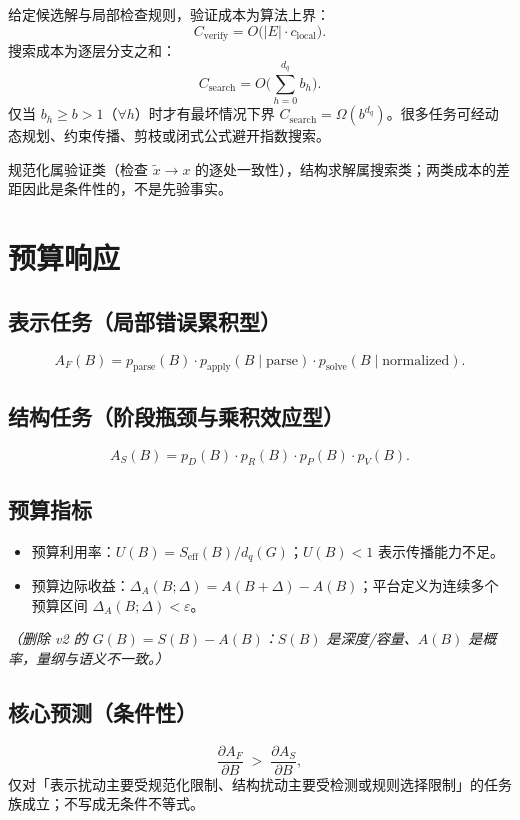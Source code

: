 \documentclass[11pt]{ctexart}
\begin{document}
给定候选解与局部检查规则，验证成本为算法上界：
\[
  C_{\mathrm{verify}} = O\big(|E|\cdot c_{\mathrm{local}}\big).
\]
搜索成本为逐层分支之和：
\[
  C_{\mathrm{search}} = O\Big(\textstyle\sum_{h=0}^{d_q} b_h\Big).
\]
仅当 $b_h\ge b>1$（$\forall h$）时才有最坏情况下界 $C_{\mathrm{search}}=\Omega(b^{d_q})$。很多任务可经动态规划、约束传播、剪枝或闭式公式避开指数搜索。

规范化属验证类（检查 $\tilde{x}\to x$ 的逐处一致性），结构求解属搜索类；两类成本的差距因此是条件性的，不是先验事实。

\section{预算响应}

\subsection{表示任务（局部错误累积型）}
\[
  A_F(B) = p_{\mathrm{parse}}(B)\cdot p_{\mathrm{apply}}(B\mid \mathrm{parse})\cdot p_{\mathrm{solve}}(B\mid \mathrm{normalized}).
\]

\subsection{结构任务（阶段瓶颈与乘积效应型）}
\[
  A_S(B) = p_D(B)\cdot p_R(B)\cdot p_P(B)\cdot p_V(B).
\]

\subsection{预算指标}
\begin{itemize}
  \item 预算利用率：$U(B) = S_{\mathrm{eff}}(B) / d_q(G)$；$U(B)<1$ 表示传播能力不足。
  \item 预算边际收益：$\Delta_A(B;\Delta) = A(B+\Delta) - A(B)$；平台定义为连续多个预算区间 $\Delta_A(B;\Delta)<\varepsilon$。
\end{itemize}
\textit{（删除 v2 的 $G(B)=S(B)-A(B)$：$S(B)$ 是深度/容量、$A(B)$ 是概率，量纲与语义不一致。）}

\subsection{核心预测（条件性）}
\[
  \frac{\partial A_F}{\partial B} \;>\; \frac{\partial A_S}{\partial B},
\]
仅对「表示扰动主要受规范化限制、结构扰动主要受检测或规则选择限制」的任务族成立；不写成无条件不等式。
\end{document}
